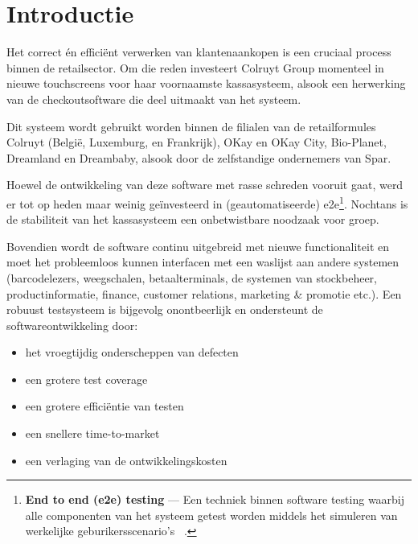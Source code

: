 
\section{Introductie} %
\label{sec:introductie}
Het correct én efficiënt verwerken van klantenaankopen is een cruciaal process binnen de retailsector. Om die reden investeert Colruyt Group momenteel in nieuwe touchscreens voor haar voornaamste kassasysteem, alsook een herwerking van de checkoutsoftware die deel uitmaakt van het systeem.

Dit systeem wordt gebruikt worden binnen de filialen van de retailformules Colruyt (België, Luxemburg, en Frankrijk), OKay en OKay City, Bio-Planet, Dreamland en Dreambaby, alsook door de zelfstandige ondernemers van Spar.

Hoewel de ontwikkeling van deze software met rasse schreden vooruit gaat, werd er tot op heden maar weinig geïnvesteerd in (geautomatiseerde) e2e\footnote{\textbf{End to end (e2e) testing} — Een techniek binnen software testing waarbij alle componenten van het systeem getest worden middels het simuleren van werkelijke geburikersscenario's ~\cite{SoftwareTestingHelp2019}.}. Nochtans is de stabiliteit van het kassasysteem een onbetwistbare noodzaak voor groep.

Bovendien wordt de software continu uitgebreid met nieuwe functionaliteit en moet het probleemloos kunnen interfacen met een waslijst aan andere systemen (barcodelezers, weegschalen, betaalterminals, de systemen van stockbeheer, productinformatie, finance, customer relations, marketing \& promotie etc.).
\vspace{\baselineskip}
Een robuust testsysteem is bijgevolg onontbeerlijk en ondersteunt de softwareontwikkeling door:

\begin{itemize}
  \item het vroegtijdig onderscheppen van defecten
  \item een grotere test coverage
  \item een grotere efficiëntie van testen
  \item een snellere time-to-market
  \item een verlaging van de ontwikkelingskosten
\end{itemize}

